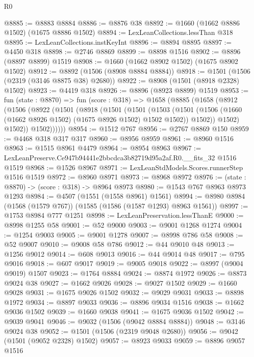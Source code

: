 \begin{lexlean}{R0}
\begin{coremodule}
@8885 := @8883 @8884
@8886 := @8876 @38
@8892 := @1660 (@1662 @8886 @1502) (@1675 @8886 @1502)
@8894 := LexLeanCollections.lessThan @318
@8895 := LexLeanCollections.instKeyInt
@8896 := @8894 @8895
@8897 := @4450 @318
@8898 := @2746 @8869
@8899 := @8898 @1516
@8902 := @8896 (@8897 @8899) @1519
@8908 := @1660 (@1662 @8902 @1502) (@1675 @8902 @1502)
@8912 := @8892 (@1506 (@8908 @8884 @8884))
@8918 := @1501 (@1506 (@2319 (@3146 @8875 @38) @2680))
@8922 := @8908 (@1501 (@8918 @2328) @1502)
@8923 := @4419 @318
@8926 := @8896 (@8923 @8899) @1519
@8953 := fun (state : @8870) =>
  fun (score : @318) =>
  @1658
    (@8885
      (@1658
        (@8912
          (@1506
            (@8922
              (@1501
                (@8918
                  (@1501
                    (@1501
                      (@1503
                        (@1501
                          (@1506 (@1660 (@1662 @8926 @1502) (@1675 @8926 @1502) @1502 @1502))
                          @1502))
                      @1502)
                    @1502))
                @1502))))))
@8954 := @1512 @767
@8956 := @2767 @8869 @150
@8959 := @4468 @318 @317 @317
@8960 := @8956 @8959
@8961 := @8960 @1516
@8963 := @1515 @8961 @4479
@8964 := @8954 @8963
@8967 := LexLeanPreserve.Ce947b94441e2bbcdca3b82719d95a2af.R0.__fits_32 @1516 @1519
@8968 := @1526 @8967
@8971 := LexLeanStdModels.Scores.runnerStep @1516 @1519
@8972 := @8960 @8971
@8973 := @8968 @8972
@8976 := (state : @8870) -> (score : @318) -> @8964 @8973
@8980 := @1543 @767 @8963 @8973 @1293
@8984 := @4507 (@1551 (@1558 @8961) @1561)
@8994 := @8980 @8984 (@1568 (@1579 @767)) (@1585 (@1586 (@1587 @1293) @8963 @1561))
@8997 := @1753 @8984 @777 @1251
@8998 := LexLeanPreservation.lessThanE
@9000 := @8998 @1255 @58
@9001 := @52 @9000
@9003 := @9001 @1268 @1274
@9004 := @1254 @9003
@9005 := @9001 @1278
@9007 := @8998 @786 @58
@9008 := @52 @9007
@9010 := @9008 @58 @786
@9012 := @44 @9010 @48
@9013 := @1256 @9012
@9014 := @608 @9013
@9016 := @44 @9014 @48
@9017 := @795 @9016
@9018 := @607 @9017
@9019 := @9005 @9018
@9022 := @8997 (@9004 @9019) @1507
@9023 := @1764 @8884
@9024 := @8874 @1972
@9026 := @8873 @9024 @38
@9027 := @1662 @9026
@9028 := @9027 @1502
@9029 := @1660 @9028
@9031 := @1675 @9026 @1502
@9032 := @9029 @9031
@9033 := @8898 @1972
@9034 := @8897 @9033
@9036 := @8896 @9034 @1516
@9038 := @1662 @9036 @1502
@9039 := @1660 @9038
@9041 := @1675 @9036 @1502
@9042 := @9039 @9041
@9046 := @9032 (@1506 (@9042 @8884 @8884))
@9048 := @3146 @9024 @38
@9052 := @1501 (@1506 (@2319 @9048 @2680))
@9056 := @9042 (@1501 (@9052 @2328) @1502)
@9057 := @8923 @9033
@9059 := @8896 @9057 @1516

\end{coremodule}
\end{lexlean}
